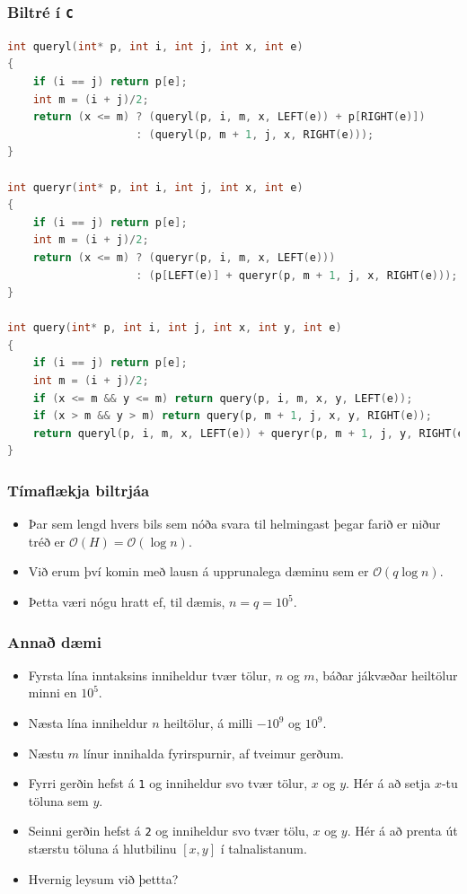 \documentclass[handout]{beamer}
\begin{document}
\begin{frame}[fragile]
	\frametitle{Biltré í \texttt{C}}
	\tiny
	\begin{lstlisting}[language=C]
int queryl(int* p, int i, int j, int x, int e)
{
	if (i == j) return p[e];
	int m = (i + j)/2;
	return (x <= m) ? (queryl(p, i, m, x, LEFT(e)) + p[RIGHT(e)])
                    : (queryl(p, m + 1, j, x, RIGHT(e)));
}

int queryr(int* p, int i, int j, int x, int e)
{
	if (i == j) return p[e];
	int m = (i + j)/2;
	return (x <= m) ? (queryr(p, i, m, x, LEFT(e)))
                    : (p[LEFT(e)] + queryr(p, m + 1, j, x, RIGHT(e)));
}

int query(int* p, int i, int j, int x, int y, int e)
{
	if (i == j) return p[e];
	int m = (i + j)/2;
	if (x <= m && y <= m) return query(p, i, m, x, y, LEFT(e));
	if (x > m && y > m) return query(p, m + 1, j, x, y, RIGHT(e));
	return queryl(p, i, m, x, LEFT(e)) + queryr(p, m + 1, j, y, RIGHT(e));
}
\end{lstlisting}
\end{frame}

\begin{frame}
\frametitle{Tímaflækja biltrjáa}
\begin{itemize}
\item<1-> Þar sem lengd hvers bils sem nóða svara til helmingast þegar farið er niður tréð er $\mathcal{O}(H) = \mathcal{O}(\log n)$.
\item<2-> Við erum því komin með lausn á upprunalega dæminu sem er $\mathcal{O}(q \log n)$.
\item<3-> Þetta væri nógu hratt ef, til dæmis, $n = q = 10^5$.
\end{itemize}
\end{frame}

\begin{frame}
\frametitle{Annað dæmi}
\begin{itemize}
\item<1-> Fyrsta lína inntaksins inniheldur tvær tölur, $n$ og $m$, báðar jákvæðar heiltölur minni en $10^5$.
\item<2-> Næsta lína inniheldur $n$ heiltölur, á milli $-10^9$ og $10^9$.
\item<3-> Næstu $m$ línur innihalda fyrirspurnir, af tveimur gerðum. 
\item<4-> Fyrri gerðin hefst á \texttt{1} og inniheldur svo tvær tölur, $x$ og $y$. Hér á að setja $x$-tu töluna sem $y$.
\item<5-> Seinni gerðin hefst á \texttt{2} og inniheldur svo tvær tölu,
$x$ og $y$. Hér á að prenta út stærstu töluna á hlutbilinu $[x, y]$ í talnalistanum.
\item<6-> Hvernig leysum við þettta?
\end{itemize}
\end{frame}
\end{document}
